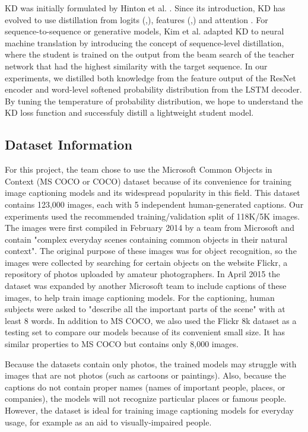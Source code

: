 \documentclass[10pt,twocolumn,letterpaper]{article}
\begin{document}
KD was initially formulated by Hinton et al. \cite{hinton2015distilling}. Since its introduction, KD has evolved to use distillation from logits (\cite{cho2019efficacy},\cite{furlanello2018born}), features (\cite{heo2019comprehensive},\cite{park2019relational}) and attention \cite{zagoruyko2017paying}. For sequence-to-sequence or generative models, Kim et al. \cite{kim2016sequencelevel} adapted KD to neural machine translation by introducing the concept of sequence-level distillation, where the student is trained on the output from the beam search of the teacher network that had the highest similarity with the target sequence. In our experiments, we distilled both knowledge from the feature output of the ResNet encoder and word-level softened probability distribution from the LSTM decoder. By tuning the temperature of probability distribution, we hope to understand the KD loss function and successfuly distill a lightweight student model.

\subsection{Dataset Information}

For this project, the team chose to use the Microsoft Common Objects in Context (MS COCO or COCO) \cite{lin2014microsoft} dataset because of its convenience for training image captioning models and its widespread popularity in this field. This dataset contains 123,000 images, each with 5 independent human-generated captions. Our experiments used the recommended training/validation split of 118K/5K images. The images were first compiled in February 2014 by a team from Microsoft and contain "complex everyday scenes containing common objects in their natural context". The original purpose of these images was for object recognition, so the images were collected by searching for certain objects on the website Flickr, a repository of photos uploaded by amateur photographers. In April 2015 \cite{chen2015COCOCaptions} the dataset was expanded by another Microsoft team to include captions of these images, to help train image captioning models. For the captioning, human subjects were asked to "describe all the important parts of the scene" with at least 8 words. In addition to MS COCO, we also used the Flickr 8k dataset as a testing set to compare our models because of its convenient small size. It has similar properties to MS COCO but contains only 8,000 images.

Because the datasets contain only photos, the trained models may struggle with images that are not photos (such as cartoons or paintings). Also, because the captions do not contain proper names (names of important people, places, or companies), the models will not recognize particular places or famous people. However, the dataset is ideal for training image captioning models for everyday usage, for example as an aid to visually-impaired people.
\end{document}
